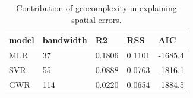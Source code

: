 \begin{table}[t]\centering
\caption{Contribution of geocomplexity in explaining spatial errors.}\label{tab:explain}
\begin{tabular}{lllll}
\hline
model & bandwidth & R2 & RSS & AIC \\
\hline
MLR &  37 & 0.1806 & 0.1101 & -1685.4 \\
SVR &  55 & 0.0888 & 0.0763 & -1816.1 \\
GWR & 114 & 0.0220 & 0.0654 & -1884.5 \\
\hline
\end{tabular}\end{table}
